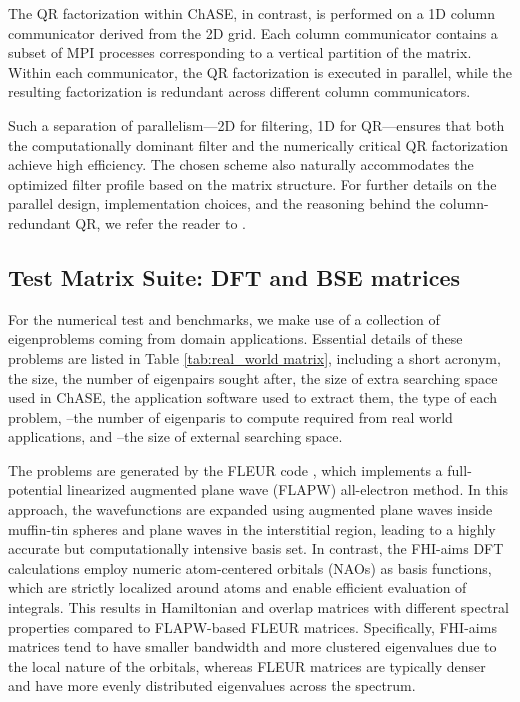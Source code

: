 The QR factorization within ChASE, in contrast, is performed on a 1D column communicator derived from the 2D grid. Each column communicator contains a subset of MPI processes corresponding to a vertical partition of the matrix. Within each communicator, the QR factorization is executed in parallel, while the resulting factorization is redundant across different column communicators. %

Such a separation of parallelism---2D for filtering, 1D for QR---ensures that both the computationally dominant filter and the numerically critical QR factorization achieve high efficiency. The chosen scheme also naturally accommodates the optimized filter profile based on the matrix structure. For further details on the parallel design, implementation choices, and the reasoning behind the column-redundant QR, we refer the reader to \cite{Wu2022chase}.

\subsection{Test Matrix Suite: DFT and BSE matrices}

For the numerical test and benchmarks, we make use of a collection of eigenproblems coming from domain applications. Essential details of these problems are listed in Table \ref{tab:real_world matrix}, including a short acronym, the size, the number of eigenpairs sought after, the size of extra searching space used in ChASE, the application software used to extract them, the type of each problem, \nev--the number of eigenparis to compute required from real world applications, and \nex--the size of external searching space.

The  problems are generated by the FLEUR code \cite{wortmann2023fleur}, which implements a full-potential linearized augmented plane wave (FLAPW) all-electron method. In this approach, the wavefunctions are expanded using augmented plane waves inside muffin-tin spheres and plane waves in the interstitial region, leading to a highly accurate but computationally intensive basis set. In contrast, the FHI-aims DFT calculations \cite{blum2009ab} employ numeric atom-centered orbitals (NAOs) as basis functions, which are strictly localized around atoms and enable efficient evaluation of integrals. This results in Hamiltonian and overlap matrices with different spectral properties compared to FLAPW-based FLEUR matrices. Specifically, FHI-aims matrices tend to have smaller bandwidth and more clustered eigenvalues due to the local nature of the orbitals, whereas FLEUR matrices are typically denser and have more evenly distributed eigenvalues across the spectrum.

